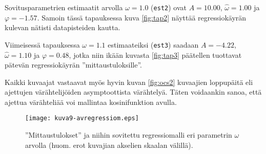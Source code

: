 \documentclass[a4paper,11pt]{article}
\begin{document}
Sovitusparametrien estimaatit arvolla $\omega=1.0$ (\texttt{est2}) ovat $A=10.00$, $\hat{\omega}=1.00$ ja $\varphi=-1.57$. Samoin tässä tapauksessa kuva \ref{fig:tap2} näyttää regressiokäyrän kulevan nätisti datapisteiden kautta.

Viimeisessä tapauksessa $\omega=1.1$ estimaateiksi (\texttt{est3}) saadaan $A=-4.22$, $\hat{\omega}=1.10$ ja $\varphi=0.48$, jotka niin ikään kuvasta \ref{fig:tap3} päätellen tuottavat pätevän regressiokäyrän ''mittaustuloksille''.

Kaikki kuvaajat vastaavat myös hyvin kuvan \ref{fig:ocs2} kuvaajien loppupäitä eli ajettujen värähtelijöiden asymptoottista värähtelyä. Täten voidaankin sanoa, että ajettua värähteliää voi mallintaa kosinifunktion avulla.

\begin{figure}
    \centering
    \texttt{[image: kuva9-avregressiom.eps]}
    \caption{''Mittaustulokset'' ja niihin sovitettu regressiomalli eri parametrin $\omega$ arvolla (huom. erot kuvajian akselien skaalan välillä).}
    \label{fig:tap1}
\end{figure}
\end{document}
